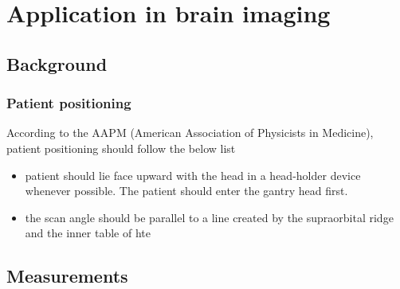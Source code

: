 \chapter{Application in brain imaging}
\section{Background}

\subsection{Patient positioning}

According to the AAPM (American Association of Physicists in Medicine), patient positioning should follow the below list\citep{aapm_headCT2012}

\begin{itemize}
\item patient should lie face upward with the head in a head-holder device whenever possible.  The patient should enter the gantry head first.
\item the scan angle should be parallel to a line created by the supraorbital ridge and the inner table of hte

\end{itemize}

\section{Measurements}
